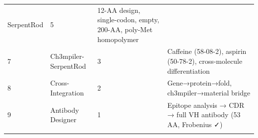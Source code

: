 \documentclass[12pt,a4paper]{article}
\begin{document}
\begin{longtable}[]{@{}llll@{}}
\begin{minipage}[t]{0.31\columnwidth}
SerpentRod\strut
\end{minipage} & \begin{minipage}[t]{0.20\columnwidth}\raggedright
5\strut
\end{minipage} & \begin{minipage}[t]{0.29\columnwidth}\raggedright
12-AA design, single-codon, empty, 200-AA, poly-Met homopolymer\strut
\end{minipage}\tabularnewline
\begin{minipage}[t]{0.09\columnwidth}\raggedright
7\strut
\end{minipage} & \begin{minipage}[t]{0.31\columnwidth}\raggedright
Ch3mpiler-SerpentRod\strut
\end{minipage} & \begin{minipage}[t]{0.20\columnwidth}\raggedright
3\strut
\end{minipage} & \begin{minipage}[t]{0.29\columnwidth}\raggedright
Caffeine (58-08-2), aspirin (50-78-2), cross-molecule
differentiation\strut
\end{minipage}\tabularnewline
\begin{minipage}[t]{0.09\columnwidth}\raggedright
8\strut
\end{minipage} & \begin{minipage}[t]{0.31\columnwidth}\raggedright
Cross-Integration\strut
\end{minipage} & \begin{minipage}[t]{0.20\columnwidth}\raggedright
2\strut
\end{minipage} & \begin{minipage}[t]{0.29\columnwidth}\raggedright
Gene→protein→fold, ch3mpiler→material bridge\strut
\end{minipage}\tabularnewline
\begin{minipage}[t]{0.09\columnwidth}\raggedright
9\strut
\end{minipage} & \begin{minipage}[t]{0.31\columnwidth}\raggedright
Antibody Designer\strut
\end{minipage} & \begin{minipage}[t]{0.20\columnwidth}\raggedright
1\strut
\end{minipage} & \begin{minipage}[t]{0.29\columnwidth}\raggedright
Epitope analysis → CDR → full VH antibody (53 AA, Frobenius ✓)\strut
\end{minipage}\tabularnewline
\begin{minipage}[t]{0.09\columnwidth}\raggedright

\end{minipage}
\end{longtable}
\end{document}
